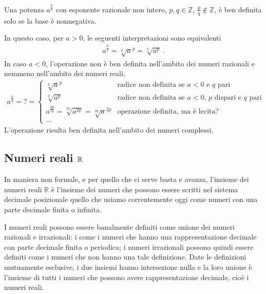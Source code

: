 \documentclass[letterpaper,10pt,italian]{jupyterBook}
\begin{document}
\sphinxAtStartPar
{} Una potenza \(a^{\frac{p}{q}}\) con esponente razionale non intero, \(p, q \in \mathbb{Z}\), \(\frac{p}{q} \notin \mathbb{Z}\), è ben definita solo se la base è non\sphinxhyphen{}negativa.

\sphinxAtStartPar
In questo caso, per \(a > 0\), le seguenti interpretazioni sono equivalenti
\begin{equation*}
\begin{split}a^{\frac{p}{q}} = {\sqrt[q]{a}}^p = \sqrt[q]{a^p} \ .\end{split}
\end{equation*}
\sphinxAtStartPar
In caso \(a < 0\), l’operazione non è ben definita nell’ambito dei numeri razionali e nemmeno nell’ambito dei numeri reali,
\begin{equation*}
\begin{split}a^{\frac{p}{q}} = ? =
\begin{cases}
  {\sqrt[q]{a}}^p & \text{radice non definita se $a<0$ e $q$ pari} \\
  \sqrt[q]{a^p}   & \text{radice non definita se $a<0$, $p$ dispari e $q$ pari} \\
  a^{\frac{2p}{2q}} = \sqrt[2q]{{a}^{2p}} ={\sqrt[2q]{a}^{2p}} & \text{operazione definita, ma è lecita?} \\
  \dots
\end{cases}\end{split}
\end{equation*}
\sphinxAtStartPar
L’operazione risulta ben definita nell’ambito dei numeri complessi,  


\subsection{Numeri reali \protect\(\mathbb{R}\protect\)}
\label{\detokenize{ch/set/numeric-sets:numeri-reali-mathbb-r}}\label{\detokenize{ch/set/numeric-sets:sets-numeric-r}}
\sphinxAtStartPar
In maniera non formale, e per quello che ci serve basta e avanza, l’insieme dei numeri reali \(\mathbb{R}\) è l’insieme dei numeri che possono essere scritti nel sistema decimale posizionale \sphinxhyphen{} quello che usiamo correntemente oggi \sphinxhyphen{} come numeri con una parte decimale finita o infinita.

\sphinxAtStartPar
I numeri reali possono essere banalmente definiti come unione dei numeri razionali e irrazionali: i {\hyperref[\detokenize{ch/set/numeric-sets:sets-numeric-q-decimals}]{}} come i numeri che hanno una rappresentazione decimale con parte decimale finita o periodica; i numeri irrazionali possono quindi essere definiti come i numeri che non hanno una tale definizione. Date le definizioni mutuamente esclusive, i due insiemi hanno intersezione nulla e la loro unione è l’insieme di tutti i numeri che possono avere rappresentazione decimale, cioè i numeri reali.
\end{document}
